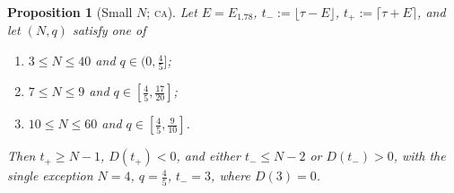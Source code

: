 \documentclass[11pt,a4paper]{article}
\newtheorem{proposition}[theorem]{Proposition}
\theoremstyle{definition}
\theoremstyle{remark}
\newcommand{\CA}{\textsc{ca}}
\begin{document}
\begin{proposition}[Small $N$; \CA]\label{prop:smallN}
Let $E=E_{1.78}$, $t_-:=\lfloor\tau-E\rfloor$, $t_+:=\lceil\tau+E\rceil$, and let $(N,q)$ satisfy one of
\begin{enumerate}
\item[(a)] $3\le N\le40$ and $q\in(0,\frac45]$;
\item[(b)] $7\le N\le9$ and $q\in[\frac45,\frac{17}{20}]$;
\item[(c)] $10\le N\le60$ and $q\in[\frac45,\frac9{10}]$.
\end{enumerate}
Then $t_+\ge N-1$, $D(t_+)<0$, and either $t_-\le N-2$ or $D(t_-)>0$, with the single exception $N=4$, $q=\frac45$,
$t_-=3$, where $D(3)=0$.
\end{proposition}
\end{document}
